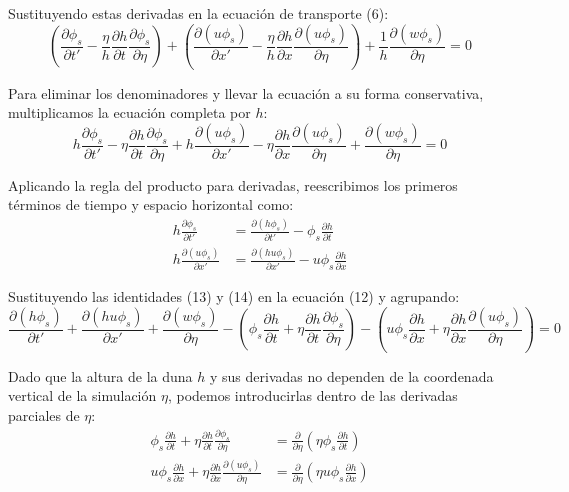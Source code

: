 \documentclass[11pt,a4paper]{article}
\begin{document}
Sustituyendo estas derivadas en la ecuación de transporte (6):
\begin{equation}
    \left( \frac{\partial \phi_s}{\partial t'} - \frac{\eta}{h}\frac{\partial h}{\partial t}\frac{\partial \phi_s}{\partial \eta} \right) + \left( \frac{\partial (u \phi_s)}{\partial x'} - \frac{\eta}{h}\frac{\partial h}{\partial x}\frac{\partial (u \phi_s)}{\partial \eta} \right) + \frac{1}{h}\frac{\partial (w \phi_s)}{\partial \eta} = 0
\end{equation}

Para eliminar los denominadores y llevar la ecuación a su forma conservativa, multiplicamos la ecuación completa por $h$:
\begin{equation}
    h \frac{\partial \phi_s}{\partial t'} - \eta \frac{\partial h}{\partial t} \frac{\partial \phi_s}{\partial \eta} + h \frac{\partial (u \phi_s)}{\partial x'} - \eta \frac{\partial h}{\partial x} \frac{\partial (u \phi_s)}{\partial \eta} + \frac{\partial (w \phi_s)}{\partial \eta} = 0
\end{equation}

Aplicando la regla del producto para derivadas, reescribimos los primeros términos de tiempo y espacio horizontal como:
\begin{align}
    h \frac{\partial \phi_s}{\partial t'} &= \frac{\partial (h\phi_s)}{\partial t'} - \phi_s \frac{\partial h}{\partial t} \\
    h \frac{\partial (u\phi_s)}{\partial x'} &= \frac{\partial (h u \phi_s)}{\partial x'} - u\phi_s \frac{\partial h}{\partial x}
\end{align}

Sustituyendo las identidades (13) y (14) en la ecuación (12) y agrupando:
\begin{equation}
    \frac{\partial (h\phi_s)}{\partial t'} + \frac{\partial (h u \phi_s)}{\partial x'} + \frac{\partial (w \phi_s)}{\partial \eta} - \left( \phi_s \frac{\partial h}{\partial t} + \eta \frac{\partial h}{\partial t} \frac{\partial \phi_s}{\partial \eta} \right) - \left( u \phi_s \frac{\partial h}{\partial x} + \eta \frac{\partial h}{\partial x} \frac{\partial (u \phi_s)}{\partial \eta} \right) = 0
\end{equation}

Dado que la altura de la duna $h$ y sus derivadas no dependen de la coordenada vertical de la simulación $\eta$, podemos introducirlas dentro de las derivadas parciales de $\eta$:
\begin{align}
    \phi_s \frac{\partial h}{\partial t} + \eta \frac{\partial h}{\partial t} \frac{\partial \phi_s}{\partial \eta} &= \frac{\partial}{\partial \eta} \left( \eta \phi_s \frac{\partial h}{\partial t} \right) \\
    u \phi_s \frac{\partial h}{\partial x} + \eta \frac{\partial h}{\partial x} \frac{\partial (u \phi_s)}{\partial \eta} &= \frac{\partial}{\partial \eta} \left( \eta u \phi_s \frac{\partial h}{\partial x} \right)
\end{align}
\end{document}
